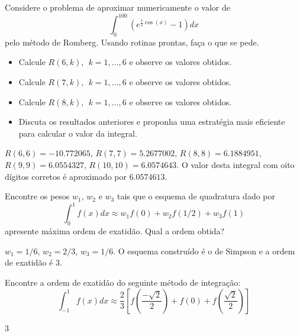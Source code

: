 \begin{Exercise} Considere o problema de aproximar numericamente o valor de
$$\int_0^{100} \left(e^{\frac{1}{2}\cos(x)}-1\right)dx$$
pelo método de Romberg. Usando rotinas prontas, faça o que se pede.
\begin{itemize}
\item Calcule $R(6,k),~~ k=1,\ldots,6$ e observe os valores obtidos.
\item Calcule $R(7,k),~~ k=1,\ldots,6$ e observe os valores obtidos.
\item Calcule $R(8,k),~~ k=1,\ldots,6$ e observe os valores obtidos.
\item Discuta os resultados anteriores e proponha uma estratégia mais eficiente para calcular o valor da integral.
\end{itemize}
\end{Exercise}
\begin{Answer}
  \begin{tiny}
 $R(6,6)=- 10.772065$, $R(7,7)=5.2677002$, $R(8,8)=6.1884951$, $R(9,9)=6.0554327$, $R(10,10)=6.0574643$. O valor desta integral com oito dígitos corretos é aproximado por  $6.0574613$.      
  \end{tiny}
\end{Answer}

\begin{Exercise} Encontre os pesos $w_1$, $w_2$ e $w_3$ tais que o esquema de quadratura dado por
$$\int_{0}^{1}f(x)dx\approx w_1f(0)+w_2f(1/2)+w_3 f(1)$$
apresente máxima ordem de exatidão. Qual a ordem obtida?
\end{Exercise}
\begin{Answer}
  \begin{tiny}
 $w_1=1/6$, $w_2=2/3$, $w_3=1/6$. O esquema construído é o de Simpson e a ordem de exatidão é 3.   
  \end{tiny}
\end{Answer}

\begin{Exercise} Encontre a ordem de exatidão do seguinte método de integração:
$$\int_{-1}^1f(x)dx\approx \frac{2}{3}\left[f\left(\frac{-\sqrt{2}}{2}\right)+f(0)+f\left(\frac{\sqrt{2}}{2}\right)\right]$$
\end{Exercise}
\begin{Answer}
  \begin{tiny}
3    
  \end{tiny}
\end{Answer}


